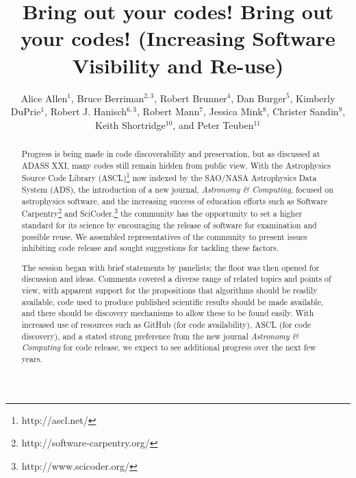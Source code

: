 \documentclass[11pt,twoside]{article}
\begin{document}
\title{Bring out your codes! Bring out your codes! (Increasing Software Visibility and Re-use)}
\author{Alice Allen$^1$, Bruce Berriman$^{2,3}$, 
Robert Brunner$^4$, Dan Burger$^5$, Kimberly DuPrie$^1$, Robert J. Hanisch$^{6,3}$, Robert Mann$^7$, Jessica Mink$^8$, Christer Sandin$^9$, Keith Shortridge$^{10}$, and Peter Teuben$^{11}$
}

\begin{abstract}

Progress is being made in code discoverability and preservation, but as discussed at ADASS XXI, many codes still remain hidden from public view. With the Astrophysics Source Code Library (ASCL)\footnote{http://ascl.net/} now indexed by the SAO/NASA Astrophysics Data System (ADS), the introduction of a new journal, {\em Astronomy \& Computing}, focused on astrophysics software, and the increasing success of education efforts such as Software Carpentry\footnote{http://software-carpentry.org/} and SciCoder,\footnote{http://www.scicoder.org/} the community has the opportunity to set a higher standard for its science by encouraging the release of software for examination and possible reuse. We assembled representatives of the community to present issues inhibiting code release and sought suggestions for tackling these factors.

The session began with brief statements by panelists; the floor was then opened for discussion and ideas. Comments covered a diverse range of related topics and points of view, with apparent support for the propositions that algorithms should be readily available, code used to produce published scientific results should be made available, and there should be discovery mechanisms to allow these to be found easily. With increased use of resources such as GitHub (for code availability), ASCL (for code discovery), and a stated strong preference from the new journal {\em Astronomy \& Computing} for code release, we expect to see additional progress over the next few years.
\end{abstract}
\end{document}

